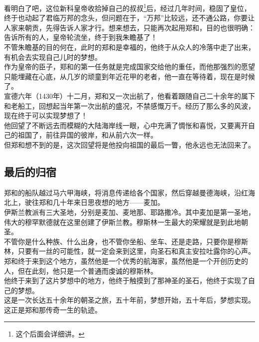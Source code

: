 \begin{multicols}{\theparacolNo}
看明白了吧，这位新科皇帝收拾掉自己的叔叔\footnote{这个后面会详细讲。}后，经过几年时间，稳固了皇位，终于也动起了君临万邦的念头，但问题在于，“万邦”比较远，还不通公路，你要让人家来朝贡，先得告诉人家才行。想来想去，只能再次起用郑和，目的也很明确：告诉所有的人，皇帝轮流坐，终于到我朱瞻基了！\\

不管朱瞻基的目的何在，此时的郑和是幸福的，他终于从众人的冷落中走了出来，有机会去实现自己儿时的梦想。\\

作为皇帝的臣子，郑和的第一任务就是完成国家交给他的重任，而他那强烈的愿望只能埋藏在心底，从几岁的顽童到年近花甲的老者，他一直在等待着，现在是时候了。\\

宣德六年（1430年）十二月，郑和又一次出航了，他看着跟随自己二十余年的属下和老船工，回想起当年第一次出航的盛况，不禁感慨万千。经历了那么多的风波，现在终于可以实现梦想了！\\

他回望了不断远去而模糊的大陆海岸线一眼，心中充满了惆怅和喜悦，又要离开自己的祖国了，前往异国的彼岸，和从前六次一样。\\

但郑和想不到的是，这次回望将是他投向祖国的最后一瞥，他永远也无法回来了。\\

\subsection{最后的归宿}
郑和的船队越过马六甲海峡，将消息传递给各个国家，然后穿越曼德海峡，沿红海北上，驶往郑和几十年来日思夜想的地方——麦加。\\

伊斯兰教派有三大圣地，分别是麦加、麦地那、耶路撒冷。其中麦加是第一圣地，伟大的穆罕默德就在这里创建了伊斯兰教。穆斯林一生最大的荣耀就是到此地朝圣。\\

不管你是什么种族、什么出身，也不管你坐船、坐车、还是走路，只要你是穆斯林，只要有一丝的可能性，就一定会来到这里，向圣石和真主安拉吐露你的心声。\\

郑和终于来到这个地方，虽然他是一个优秀的航海家，虽然他是一个开创历史的人，但在此刻，他只是一个普通而虔诚的穆斯林。\\

他终于来到了这片梦想中的地方，他终于触摸到了那神圣的圣石，他终于实现了自己的梦想。\\

这是一次长达五十余年的朝圣之旅，五十年前，梦想开始，五十年后，梦想实现。这正是郑和那传奇一生的轨迹。\\


\end{multicols}
